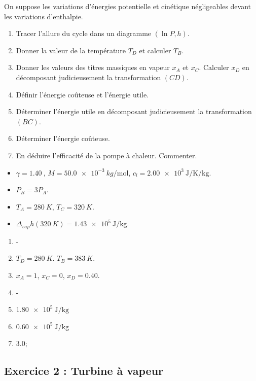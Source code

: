 On suppose les variations d'énergies potentielle et cinétique négligeables devant les variations d'enthalpie.

\begin{enumerate}
	\item Tracer l'allure du cycle dans un diagramme  $(\ln P, h)$.
	\item Donner la valeur de la température $T_D$ et calculer $T_B$.
	\item Donner les valeurs des titres massiques en vapeur $x_A$ et $x_C$. Calculer $x_D$ en décomposant judicieusement la transformation $(CD)$.
	\item Définir l'énergie coûteuse et l'énergie utile. 
	\item Déterminer l'énergie utile en décomposant judicieusement la transformation $(BC)$. 
	\item Déterminer l'énergie coûteuse.
	\item En déduire l'efficacité de la pompe à chaleur. Commenter.
\end{enumerate}

\begin{itemize}
	\item $\gamma = \SI{1.40}{}$, $M = \SI{50.0e-3}{kg\per\mol}$, $c_l = \SI{2.00e3}{\joule\per\kelvin\per\kilogram}$.
	\item $P_B = 3P_A$.
	\item $T_A = \SI{280}{K}$, $T_C = \SI{320}{K}$.
	\item $\Delta_{vap}h(\SI{320}{K}) = \SI{1.43e5}{\joule\per\kilogram}$.
\end{itemize}

\begin{enumerate}
	\item -
	\item $T_D = \SI{280}{K}$. $T_B = \SI{383}{K}$.
	\item $x_A = 1$, $x_C = 0$, $x_D = 0.40$.
	\item -
	\item $\SI{1.80e5}{\joule\per\kilogram}$
	\item $\SI{0.60e5}{\joule\per\kilogram}$
	\item 3.0; 
\end{enumerate}

\subsection{Exercice 2 : Turbine à vapeur}

